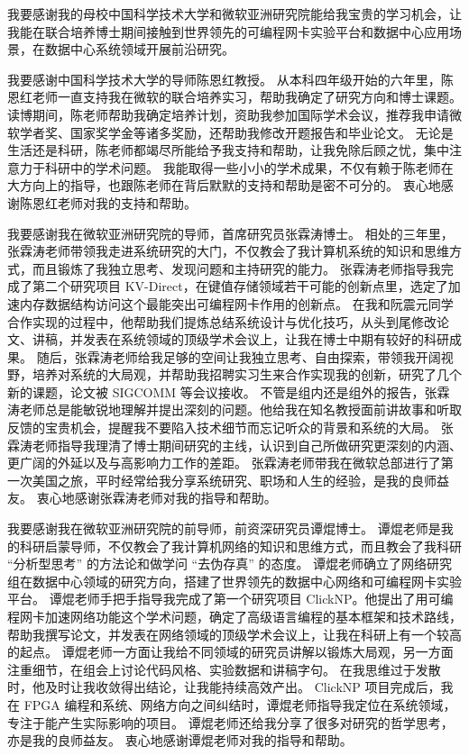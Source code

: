 
\begin{acknowledgements}

我要感谢我的母校中国科学技术⼤学和微软亚洲研究院能给我宝贵的学习机会，让我能在联合培养博士期间接触到世界领先的可编程网卡实验平台和数据中心应用场景，在数据中心系统领域开展前沿研究。

我要感谢中国科学技术⼤学的导师陈恩红教授。
从本科四年级开始的六年里，陈恩红老师一直支持我在微软的联合培养实习，帮助我确定了研究方向和博士课题。
读博期间，陈老师帮助我确定培养计划，资助我参加国际学术会议，推荐我申请微软学者奖、国家奖学金等诸多奖励，还帮助我修改开题报告和毕业论文。
无论是生活还是科研，陈老师都竭尽所能给予我⽀持和帮助，让我免除后顾之忧，集中注意⼒于科研中的学术问题。
我能取得一些小小的学术成果，不仅有赖于陈⽼师在大方向上的指导，也跟陈老师在背后默默的⽀持和帮助是密不可分的。
衷心地感谢陈恩红老师对我的支持和帮助。

我要感谢我在微软亚洲研究院的导师，首席研究员张霖涛博士。
相处的三年里，张霖涛老师带领我走进系统研究的大门，不仅教会了我计算机系统的知识和思维方式，而且锻炼了我独立思考、发现问题和主持研究的能力。
张霖涛老师指导我完成了第二个研究项目 KV-Direct，在键值存储领域若干可能的创新点里，选定了加速内存数据结构访问这个最能突出可编程网卡作用的创新点。
在我和阮震元同学合作实现的过程中，他帮助我们提炼总结系统设计与优化技巧，从头到尾修改论文、讲稿，并发表在系统领域的顶级学术会议上，让我在博士中期有较好的科研成果。
随后，张霖涛老师给我足够的空间让我独立思考、自由探索，带领我开阔视野，培养对系统的大局观，并帮助我招聘实习生来合作实现我的创新，研究了几个新的课题，论文被 SIGCOMM 等会议接收。
不管是组内还是组外的报告，张霖涛老师总是能敏锐地理解并提出深刻的问题。他给我在知名教授面前讲故事和听取反馈的宝贵机会，提醒我不要陷入技术细节而忘记听众的背景和系统的大局。
张霖涛老师指导我理清了博士期间研究的主线，认识到自己所做研究更深刻的内涵、更广阔的外延以及与高影响力工作的差距。
张霖涛老师带我在微软总部进行了第一次美国之旅，平时经常给我分享系统研究、职场和人生的经验，是我的良师益友。
衷心地感谢张霖涛老师对我的指导和帮助。

我要感谢我在微软亚洲研究院的前导师，前资深研究员谭焜博⼠。
谭焜老师是我的科研启蒙导师，不仅教会了我计算机⽹络的知识和思维⽅式，⽽且教会了我科研 ``分析型思考'' 的⽅法论和做学问 ``去伪存真'' 的态度。
谭焜老师确立了网络研究组在数据中心领域的研究方向，搭建了世界领先的数据中心网络和可编程网卡实验平台。
谭焜老师手把手指导我完成了第一个研究项目 ClickNP。他提出了用可编程网卡加速网络功能这个学术问题，确定了高级语言编程的基本框架和技术路线，帮助我撰写论文，并发表在网络领域的顶级学术会议上，让我在科研上有一个较高的起点。
谭焜老师一方面让我给不同领域的研究员讲解以锻炼大局观，另一方面注重细节，在组会上讨论代码风格、实验数据和讲稿字句。
在我思维过于发散时，他及时让我收敛得出结论，让我能持续高效产出。
ClickNP 项目完成后，我在 FPGA 编程和系统、网络方向之间纠结时，谭焜老师指导我定位在系统领域，专注于能产生实际影响的项目。
谭焜老师还给我分享了很多对研究的哲学思考，亦是我的良师益友。
衷⼼地感谢谭焜⽼师对我的指导和帮助。



\end{acknowledgements}
